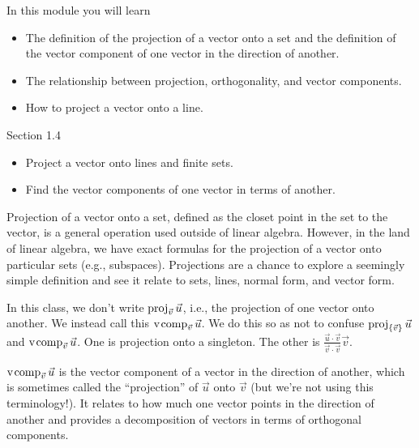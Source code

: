 \begin{module}

	In this module you will learn
	\begin{itemize}
		\item The definition of the projection of a vector onto a set and the definition of the vector component of one vector
			in the direction of another.
		\item The relationship between projection, orthogonality, and vector components.
		\item How to project a vector onto a line.
	\end{itemize}

	
	

\end{module}
\begin{lesson}

	Section 1.4

	\begin{itemize}
		\item Project a vector onto lines and finite sets.
		\item Find the vector components of one vector in terms of another.
	\end{itemize}

	Projection of a vector onto a set, defined as the closet point in the
	set to the vector, is a general operation used outside of linear algebra.
	However, in the land of linear algebra, we have exact formulas for the
	projection of a vector onto particular sets (e.g., subspaces). 
	Projections are a chance to explore a seemingly simple definition
	and see it relate to sets, lines, normal form, and vector form.

	\begin{annotation}
		\begin{notes}
			In this class, we don't write $\operatorname{proj}_{\vec v}\vec u$,
			i.e., the projection of one vector onto another. We
			instead call this $\operatorname{\operatorname{v\hspace{1pt}comp}}_{\vec v}\vec u$. We do this so
			as not to confuse $\operatorname{proj}_{\{\vec v\}}\vec u$ and
			$\operatorname{\operatorname{v\hspace{1pt}comp}}_{\vec v}\vec u$. One is projection onto a singleton.
			The other is $\frac{\vec u\cdot \vec v}{\vec v\cdot \vec v}\vec v$.
		\end{notes}
	\end{annotation}
	$\operatorname{\operatorname{v\hspace{1pt}comp}}_{\vec v}\vec u$ is the vector component of a vector in the direction of another,
	which is sometimes called the ``projection'' of $\vec u$ onto $\vec v$ (but we're not using
	this terminology!). It relates
	to how much one vector points in the direction of another and
	provides a decomposition of vectors in terms of orthogonal components.


\end{lesson}
	\bookonlynewpage

